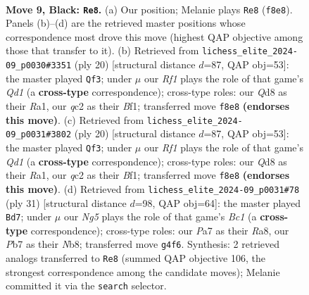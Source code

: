 \documentclass[11pt]{article}
\begin{document}
\clearpage

\begin{figure}[p]\centering
\begin{subfigure}{0.46\textwidth}\centering
\resizebox{\linewidth}{!}{%
\newchessgame
\chessboard[
  setfen={rnbq1rk1/pp2bppp/2p5/3p4/3P1Bn1/2N1P3/PPQ1NPPP/R3KB1R b KQ - 5 9},
  showmover=false,
  pgfstyle=straightmove, color=movearrow, markmove={f8-e8}
]}
\caption{}
\end{subfigure}\hfill
\begin{subfigure}{0.46\textwidth}\centering
\resizebox{\linewidth}{!}{%
\newchessgame
\chessboard[
  setfen={r1b1kb1r/1pqn1pp1/p2ppn1p/8/3NPP2/P1N5/1PP2BPP/R2QKB1R w KQkq - 3 11},
  showmover=false,
  pgfstyle=straightmove, color=movearrow, markmove={d1-f3}
]}
\caption{}
\end{subfigure}
\\[4pt]
\begin{subfigure}{0.46\textwidth}\centering
\resizebox{\linewidth}{!}{%
\newchessgame
\chessboard[
  setfen={r1b1kb1r/1pqn1pp1/p2ppn1p/8/3NPP2/P1N5/1PP2BPP/R2QKB1R w KQkq - 3 11},
  showmover=false,
  pgfstyle=straightmove, color=movearrow, markmove={d1-f3}
]}
\caption{}
\end{subfigure}\hfill
\begin{subfigure}{0.46\textwidth}\centering
\resizebox{\linewidth}{!}{%
\newchessgame
\chessboard[
  setfen={rnb2rk1/2q1bppp/3p1n2/pp1Pp3/4P3/P2B1N1P/1P1N1PP1/R1BQR1K1 b - - 2 16},
  showmover=false,
  pgfstyle=straightmove, color=movearrow, markmove={c8-d7}
]}
\caption{}
\end{subfigure}
\caption{\textbf{Move 9, Black: \texttt{Re8}.} (a) Our position; Melanie plays \texttt{Re8} (\texttt{f8e8}). Panels (b)--(d) are the retrieved master positions whose correspondence most drove this move (highest QAP objective among those that transfer to it). (b) Retrieved from \texttt{lichess\_elite\_2024-09\_p0030\#3351} (ply 20) [structural distance $d$=87, QAP obj=53]: the master played \texttt{Qf3}; under $\mu$ our \emph{Rf1} plays the role of that game's \emph{Qd1} (a \textbf{cross-type} correspondence); cross-type roles: our \emph{Q}d8 as their \emph{R}a1, our \emph{q}c2 as their \emph{B}f1; transferred move \texttt{f8e8} \textbf{(endorses this move)}. (c) Retrieved from \texttt{lichess\_elite\_2024-09\_p0031\#3802} (ply 20) [structural distance $d$=87, QAP obj=53]: the master played \texttt{Qf3}; under $\mu$ our \emph{Rf1} plays the role of that game's \emph{Qd1} (a \textbf{cross-type} correspondence); cross-type roles: our \emph{Q}d8 as their \emph{R}a1, our \emph{q}c2 as their \emph{B}f1; transferred move \texttt{f8e8} \textbf{(endorses this move)}. (d) Retrieved from \texttt{lichess\_elite\_2024-09\_p0031\#78} (ply 31) [structural distance $d$=98, QAP obj=64]: the master played \texttt{Bd7}; under $\mu$ our \emph{Ng5} plays the role of that game's \emph{Bc1} (a \textbf{cross-type} correspondence); cross-type roles: our \emph{P}a7 as their \emph{R}a8, our \emph{P}b7 as their \emph{N}b8; transferred move \texttt{g4f6}. Synthesis: 2 retrieved analogs transferred to \texttt{Re8} (summed QAP objective 106, the strongest correspondence among the candidate moves); Melanie committed it via the \texttt{search} selector.}

\end{figure}
\end{document}
